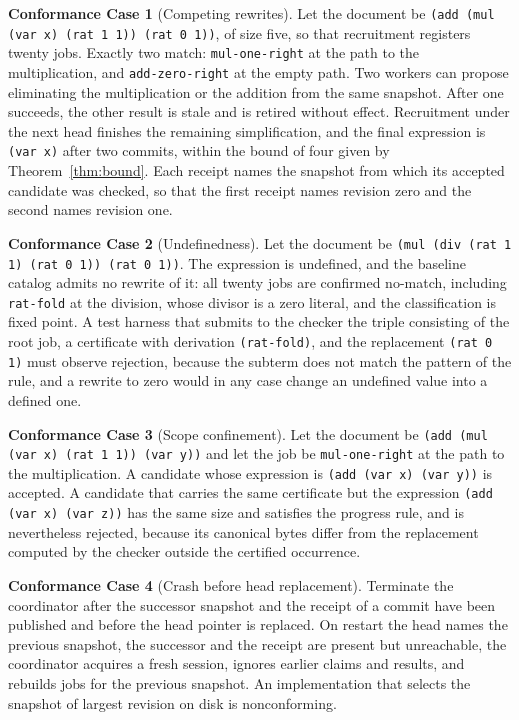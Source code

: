 \documentclass[11pt,a4paper]{article}
\theoremstyle{plain}
\theoremstyle{definition}
\theoremstyle{remark}
\theoremstyle{definition}
\newtheorem{case}{Conformance Case}
\newcommand{\code}[1]{\texttt{#1}}
\begin{document}
\begin{case}[Competing rewrites]
Let the document be \code{(add (mul (var x) (rat 1 1)) (rat 0 1))}, of size five, so that recruitment registers twenty jobs. Exactly two match: \code{mul-one-right} at the path to the multiplication, and \code{add-zero-right} at the empty path. Two workers can propose eliminating the multiplication or the addition from the same snapshot. After one succeeds, the other result is stale and is retired without effect. Recruitment under the next head finishes the remaining simplification, and the final expression is \code{(var x)} after two commits, within the bound of four given by Theorem~\ref{thm:bound}. Each receipt names the snapshot from which its accepted candidate was checked, so that the first receipt names revision zero and the second names revision one.
\end{case}

\begin{case}[Undefinedness]
Let the document be \code{(mul (div (rat 1 1) (rat 0 1)) (rat 0 1))}. The expression is undefined, and the baseline catalog admits no rewrite of it: all twenty jobs are confirmed no-match, including \code{rat-fold} at the division, whose divisor is a zero literal, and the classification is fixed point. A test harness that submits to the checker the triple consisting of the root job, a certificate with derivation \code{(rat-fold)}, and the replacement \code{(rat 0 1)} must observe rejection, because the subterm does not match the pattern of the rule, and a rewrite to zero would in any case change an undefined value into a defined one.
\end{case}

\begin{case}[Scope confinement]
Let the document be \code{(add (mul (var x) (rat 1 1)) (var y))} and let the job be \code{mul-one-right} at the path to the multiplication. A candidate whose expression is \code{(add (var x) (var y))} is accepted. A candidate that carries the same certificate but the expression \code{(add (var x) (var z))} has the same size and satisfies the progress rule, and is nevertheless rejected, because its canonical bytes differ from the replacement computed by the checker outside the certified occurrence.
\end{case}

\begin{case}[Crash before head replacement]
Terminate the coordinator after the successor snapshot and the receipt of a commit have been published and before the head pointer is replaced. On restart the head names the previous snapshot, the successor and the receipt are present but unreachable, the coordinator acquires a fresh session, ignores earlier claims and results, and rebuilds jobs for the previous snapshot. An implementation that selects the snapshot of largest revision on disk is nonconforming.
\end{case}
\end{document}
